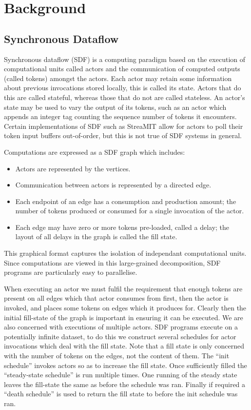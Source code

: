 \chapter{Background}
\section{Synchronous Dataflow}
Synchronous dataflow (SDF) is a computing paradigm based on the execution of computational units called actors and the communication of computed outputs (called tokens) amongst the actors.
Each actor may retain some information about previous invocations stored locally, this is called its state.
Actors that do this are called stateful, whereas those that do not are called stateless.
An actor's state may be used to vary the output of its tokens, such as an actor which appends an integer tag counting the sequence number of tokens it encounters.
Certain implementations of SDF such as StreaMIT \cite{thies02} allow for actors to poll their token input buffers out-of-order, but this is not true of SDF systems in general.

Computations are expressed as a SDF graph which includes:
\begin{itemize}
	\item Actors are represented by the vertices.
	\item Communication between actors is represented by a directed edge.
	\item Each endpoint of an edge has a consumption and production amount; the number of tokens produced or consumed for a single invocation of the actor.
	\item Each edge may have zero or more tokens pre-loaded, called a delay; the layout of all delays in the graph is called the fill state.
\end{itemize}
This graphical format captures the isolation of independant computational units.
Since computations are viewed in this large-grained decomposition, SDF programs are particularly easy to parallelise.

When executing an actor we must fulfil the requirement that enough tokens are present on all edges which that actor consumes from first, then the actor is invoked, and places some tokens on edges which it produces for.
Clearly then the initial fill-state of the graph is important in ensuring it can be executed.
We are also concerned with executions of multiple actors.
SDF programs execute on a potentially infinite dataset, to do this we construct several schedules for actor invocations which deal with the fill state.
Note that a fill state is only concerned with the number of tokens on the edges, not the content of them.
The ``init schedule'' invokes actors so as to increase the fill state.
Once sufficiently filled the ``steady-state schedule'' is run multiple times.
One running of the steady state leaves the fill-state the same as before the schedule was ran.
Finally if required a ``death schedule'' is used to return the fill state to before the init schedule was ran.

